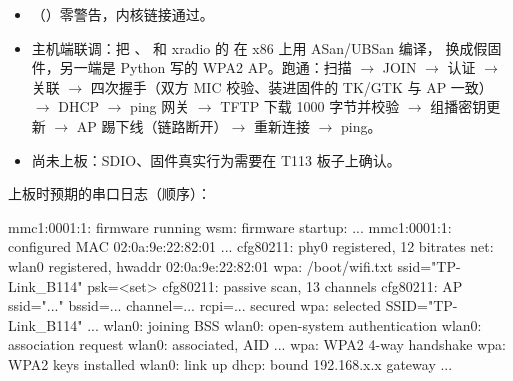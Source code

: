 \begin{itemize}
  \item {}（）零警告，内核链接通过。
  \item 主机端联调：把 、 和 xradio 的  在 x86 上用 ASan/UBSan 编译， 换成假固件，另一端是 Python 写的 WPA2 AP。跑通：扫描 $\rightarrow$ JOIN $\rightarrow$ 认证 $\rightarrow$ 关联 $\rightarrow$ 四次握手（双方 MIC 校验、装进固件的 TK/GTK 与 AP 一致）$\rightarrow$ DHCP $\rightarrow$ ping 网关 $\rightarrow$ TFTP 下载 1000 字节并校验 $\rightarrow$ 组播密钥更新 $\rightarrow$ AP 踢下线（链路断开）$\rightarrow$ 重新连接 $\rightarrow$ ping。
  \item 尚未上板：SDIO、固件真实行为需要在 T113 板子上确认。
\end{itemize}

上板时预期的串口日志（顺序）：

\begin{txtcode}
mmc1:0001:1: firmware running
wsm: firmware startup: ...
mmc1:0001:1: configured MAC 02:0a:9e:22:82:01 ...
cfg80211: phy0 registered, 12 bitrates
net: wlan0 registered, hwaddr 02:0a:9e:22:82:01
wpa: /boot/wifi.txt ssid="TP-Link_B114" psk=<set>
cfg80211: passive scan, 13 channels
cfg80211: AP ssid="..." bssid=... channel=... rcpi=... secured
wpa: selected SSID="TP-Link_B114" ...
wlan0: joining BSS
wlan0: open-system authentication
wlan0: association request
wlan0: associated, AID ...
wpa: WPA2 4-way handshake
wpa: WPA2 keys installed
wlan0: link up
dhcp: bound 192.168.x.x gateway ...
\end{txtcode}
